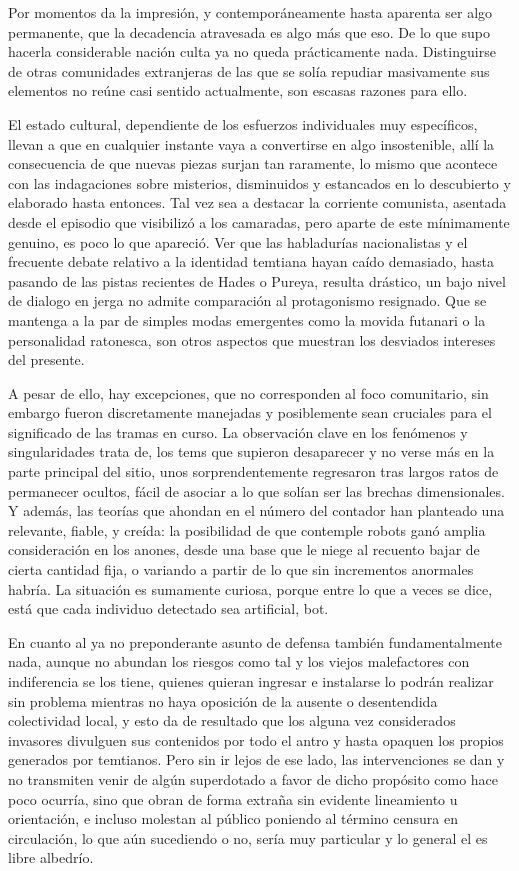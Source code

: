 \documentclass[
]{book}
\begin{document}
Por momentos da la impresión, y contemporáneamente hasta aparenta ser algo permanente, que la decadencia atravesada es algo más que eso. De lo que supo hacerla considerable nación culta ya no queda prácticamente nada. Distinguirse de otras comunidades extranjeras de las que se solía repudiar masivamente sus elementos no reúne casi sentido actualmente, son escasas razones para ello.

El estado cultural, dependiente de los esfuerzos individuales muy específicos, llevan a que en cualquier instante vaya a convertirse en algo insostenible, allí la consecuencia de que nuevas piezas surjan tan raramente, lo mismo que acontece con las indagaciones sobre misterios, disminuidos y estancados en lo descubierto y elaborado hasta entonces. Tal vez sea a destacar la corriente comunista, asentada desde el episodio que visibilizó a los camaradas, pero aparte de este mínimamente genuino, es poco lo que apareció. Ver que las habladurías nacionalistas y el frecuente debate relativo a la identidad temtiana hayan caído demasiado, hasta pasando de las pistas recientes de Hades o Pureya, resulta drástico, un bajo nivel de dialogo en jerga no admite comparación al protagonismo resignado. Que se mantenga a la par de simples modas emergentes como la movida futanari o la personalidad ratonesca, son otros aspectos que muestran los desviados intereses del presente.

A pesar de ello, hay excepciones, que no corresponden al foco comunitario, sin embargo fueron discretamente manejadas y posiblemente sean cruciales para el significado de las tramas en curso. La observación clave en los fenómenos y singularidades trata de, los tems que supieron desaparecer y no verse más en la parte principal del sitio, unos sorprendentemente regresaron tras largos ratos de permanecer ocultos, fácil de asociar a lo que solían ser las brechas dimensionales. Y además, las teorías que ahondan en el número del contador han planteado una relevante, fiable, y creída: la posibilidad de que contemple robots ganó amplia consideración en los anones, desde una base que le niege al recuento bajar de cierta cantidad fija, o variando a partir de lo que sin incrementos anormales habría. La situación es sumamente curiosa, porque entre lo que a veces se dice, está que cada individuo detectado sea artificial, bot.

En cuanto al ya no preponderante asunto de defensa también fundamentalmente nada, aunque no abundan los riesgos como tal y los viejos malefactores con indiferencia se los tiene, quienes quieran ingresar e instalarse lo podrán realizar sin problema mientras no haya oposición de la ausente o desentendida colectividad local, y esto da de resultado que los alguna vez considerados invasores divulguen sus contenidos por todo el antro y hasta opaquen los propios generados por temtianos. Pero sin ir lejos de ese lado, las intervenciones se dan y no transmiten venir de algún superdotado a favor de dicho propósito como hace poco ocurría, sino que obran de forma extraña sin evidente lineamiento u orientación, e incluso molestan al público poniendo al término censura en circulación, lo que aún sucediendo o no, sería muy particular y lo general el es libre albedrío.
\end{document}
